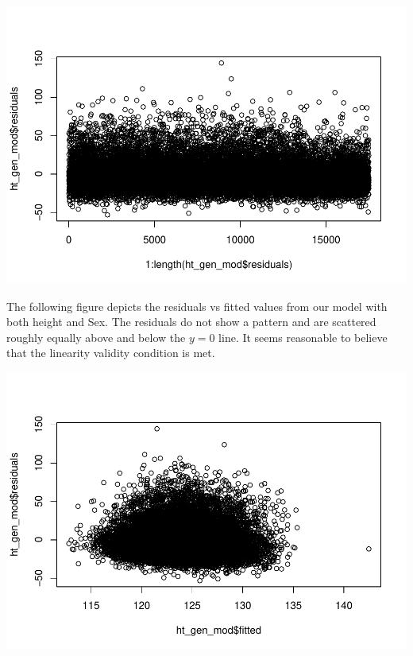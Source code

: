 \documentclass[
]{book}
\newenvironment{Shaded}{\begin{snugshade}}{\end{snugshade}}
\newcommand{\FunctionTok}[1]{\textcolor[rgb]{0.00,0.00,0.00}{#1}}
\newcommand{\NormalTok}[1]{#1}
\newcommand{\SpecialCharTok}[1]{\textcolor[rgb]{0.00,0.00,0.00}{#1}}
\begin{document}
\includegraphics{MA206supplement_files/figure-latex/unnamed-chunk-7-1.pdf}

The following figure depicts the residuals vs fitted values from our model with both height and Sex. The residuals do not show a pattern and are scattered roughly equally above and below the \(y = 0\) line. It seems reasonable to believe that the linearity validity condition is met.

\begin{Shaded}
\end{Shaded}

\includegraphics{MA206supplement_files/figure-latex/unnamed-chunk-8-1.pdf}
\end{document}
